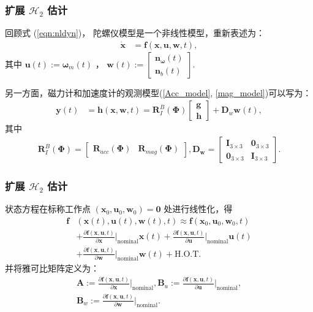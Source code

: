 \documentclass{beamer}
\newcommand{\omegab}{{\vo{\omega}}}
\newcommand{\vo}[1]{\boldsymbol{#1}}
\begin{document}
	
	\begin{frame}
		\frametitle{扩展 $\mathcal{H}_2$ 估计}
		回顾式 (\ref{eqn:nldyn})， 陀螺仪模型是一个非线性模型，重新表述为：
		\begin{align}\label{sys_eq}
			\Dot{\vo{x}} &= \vo{f}(\vo{x},\vo{u},\vo{w},t),
		\end{align}
其中 $\vo{u}(t) := \omegab_m(t)$ ， $\vo{w}(t):=\begin{bmatrix}
	\vo{n}_\omegab(t)\\
	\vo{n}_b(t)
\end{bmatrix}$.
		
		
		另一方面，磁力计和加速度计的观测模型(\ref{Acc_model}, \ref{mag_model})可以写为：
		\begin{align} \label{eqn:measureEQ}
			\vo{y}(t) &= \vo{h}(\vo{x},\vo{w},t) = \vo{R}^B_I(\vo{\Phi})
			\begin{bmatrix}
				\vo{g} \\ \vo{h}
			\end{bmatrix}  + \vo{D}_w \vo{w}(t),
		\end{align}
		其中
		\vspace{-.3cm}
		\begin{gather*}
			\vo{R}^B_I(\vo{\Phi})
			=
			\begin{bmatrix}
				\vo{R}_{acc}(\vo{\Phi})& \vo{R}_{mag}(\vo{\Phi})
			\end{bmatrix},
			\vo{D_w} =
			\begin{bmatrix}
				\vo{I}_{3\times3} & \vo{0}_{3\times3}\\
				\vo{0}_{3\times3} & \vo{I}_{3\times3}
			\end{bmatrix}.
		\end{gather*}
	\end{frame}


\begin{frame}
	\frametitle{扩展 $\mathcal{H}_2$ 估计}
	状态方程在标称工作点 $(\vo{x}_0,\vo{u}_0, \vo{w}_0) = \vo{0}$ 处进行线性化，得
	\begin{align}
		\vo{f}&(\vo{x}(t), \vo{u}(t), \vo{w}(t), t) \approx \vo{f}(\vo{x}_0, \vo{u}_0,\vo{w}_0, t)\\ \nonumber
		&+\frac{\partial \vo{f} (\vo{x},\vo{u},t)}{\partial \vo{x}}\Bigg|_{\text{nominal}} \vo{x}(t)  +\frac{\partial \vo{f} (\vo{x},\vo{u},t)}{\partial \vo{u}}\Bigg|_{\text{nominal}} \vo{u}(t)\\ \nonumber
		&+ \frac{\partial \vo{f} (\vo{x},\vo{u},t)}{\partial \vo{w}}\Bigg|_{\text{nominal}} \vo{w}(t) + \textrm{H.O.T.}
	\end{align}
并将雅可比矩阵定义为：
\begin{align} \nonumber
	\vo{A}  := \frac{\partial \vo{f}(\vo{x},\vo{u},t)}{\partial \vo{x}}\Bigg|_{\text{nominal}},
	\vo{B}_u  := \frac{\partial \vo{f}(\vo{x},\vo{u},t)}{\partial \vo{u}}\Bigg|_{\text{nominal}},\\
	\vo{B}_w  := \frac{\partial \vo{f}(\vo{x},\vo{u},t)}{\partial \vo{w}}\Bigg|_{\text{nominal}}.
\end{align}
\end{frame}
\end{document}
